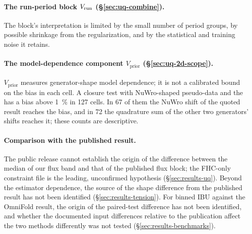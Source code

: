\paragraph{The run-period block $V_{\mathrm{run}}$ (\S\ref{sec:uq-combine}).} The block's interpretation is limited by the small number of period groups, by possible shrinkage from the regularization, and by the statistical and training noise it retains.

\paragraph{The model-dependence component $V_{\mathrm{prior}}$ (\S\ref{sec:uq-2d-scope}).} $V_{\mathrm{prior}}$ measures generator-shape model dependence; it is not a calibrated bound on the bias in each cell. A closure test with NuWro-shaped pseudo-data and the \estPurity{} has a bias above \SI{1}{\percent} in 127 cells. In 67 of them the NuWro shift of the quoted result reaches the bias, and in 72 the quadrature sum of the other two generators' shifts reaches it; these counts are descriptive.

\paragraph{Comparison with the published result.} The public release cannot establish the origin of the difference between the median of our flux band and that of the published flux block; the FHC-only constraint file is the leading, unconfirmed hypothesis (\S\ref{sec:results-uq}). Beyond the estimator dependence, the source of the shape difference from the published result has not been identified (\S\ref{sec:results-tension}). For binned IBU against the OmniFold result, the origin of the paired-test difference has not been identified, and whether the documented input differences relative to the publication affect the two methods differently was not tested (\S\ref{sec:results-benchmarks}).

